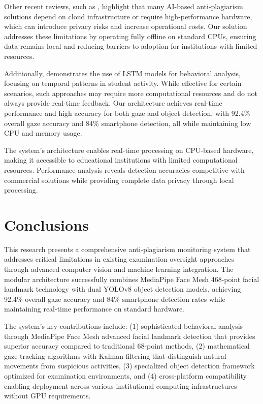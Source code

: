 \documentclass[conference]{IEEEtran}
\begin{document}
Other recent reviews, such as \cite{abbas2022review}, highlight that many AI-based anti-plagiarism solutions depend on cloud infrastructure or require high-performance hardware, which can introduce privacy risks and increase operational costs. Our solution addresses these limitations by operating fully offline on standard CPUs, ensuring data remains local and reducing barriers to adoption for institutions with limited resources.

Additionally, \cite{alsabhan2023} demonstrates the use of LSTM models for behavioral analysis, focusing on temporal patterns in student activity. While effective for certain scenarios, such approaches may require more computational resources and do not always provide real-time feedback. Our architecture achieves real-time performance and high accuracy for both gaze and object detection, with 92.4\% overall gaze accuracy and 84\% smartphone detection, all while maintaining low CPU and memory usage.

The system's architecture enables real-time processing on CPU-based hardware, making it accessible to educational institutions with limited computational resources. Performance analysis reveals detection accuracies competitive with commercial solutions while providing complete data privacy through local processing.

\section{Conclusions}

This research presents a comprehensive anti-plagiarism monitoring system that addresses 
critical limitations in existing examination oversight approaches through advanced 
computer vision and machine learning integration. The modular architecture successfully 
combines MediaPipe Face Mesh 468-point facial landmark technology with dual YOLOv8 
object detection models, achieving 92.4\% overall gaze accuracy and 84\% smartphone 
detection rates while maintaining real-time performance on standard hardware.

The system's key contributions include: (1) sophisticated behavioral analysis through 
MediaPipe Face Mesh advanced facial landmark detection that provides superior accuracy 
compared to traditional 68-point methods, (2) mathematical gaze tracking algorithms 
with Kalman filtering that distinguish natural movements from suspicious activities, 
(3) specialized object detection framework optimized for examination environments, 
and (4) cross-platform compatibility enabling deployment across various institutional 
computing infrastructures without GPU requirements.
\end{document}
